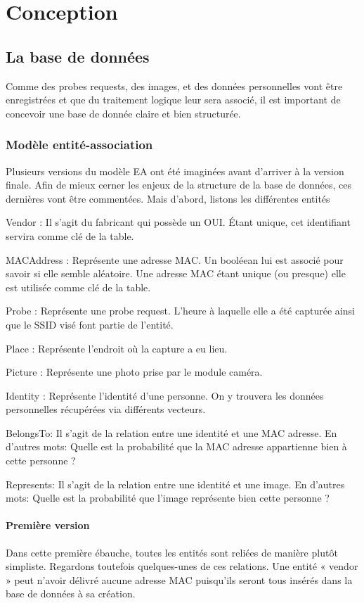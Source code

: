 \chapter{Conception}
\label{ch:conception}

\section{La base de données}
\label{sec:database}
Comme des probes requests, des images, et des données personnelles vont être enregistrées et que du traitement
logique leur sera associé, il est important de concevoir une base de donnée claire et bien structurée.

\subsection{Modèle entité-association}
Plusieurs versions du modèle EA ont été imaginées avant d’arriver à la version finale. Afin de mieux cerner les enjeux
de la structure de la base de données, ces dernières vont être commentées. Mais d’abord, listons les différentes
entités

Vendor : Il s’agit du fabricant qui possède un OUI. Étant unique, cet identifiant servira comme clé de la table.

MACAddress : Représente une adresse MAC. Un booléean lui est associé pour savoir si elle semble aléatoire. Une
adresse MAC étant unique (ou presque) elle est utilisée comme clé de la table.

Probe : Représente une probe request. L’heure à laquelle elle a été capturée ainsi que le SSID visé font partie de
l’entité.

Place : Représente l’endroit où la capture a eu lieu.

Picture : Représente une photo prise par le module caméra.

Identity : Représente l’identité d’une personne. On y trouvera les données personnelles récupérées via différents
vecteurs.

BelongsTo: Il s'agit de la relation entre une identité et une MAC adresse. En d'autres mots:
Quelle est la probabilité que la MAC adresse appartienne bien à cette personne ?

Represents: Il s'agit de la relation entre une identité et une image. En d'autres mots:
Quelle est la probabilité que l'image représente bien cette personne ?


\subsubsection{Première version}
Dans cette première ébauche, toutes les entités sont reliées de manière plutôt simpliste. Regardons toutefois
quelques-unes de ces relations.
Une entité « vendor » peut n’avoir délivré aucune adresse MAC puisqu’ils seront tous insérés dans la base de données
à sa création.

